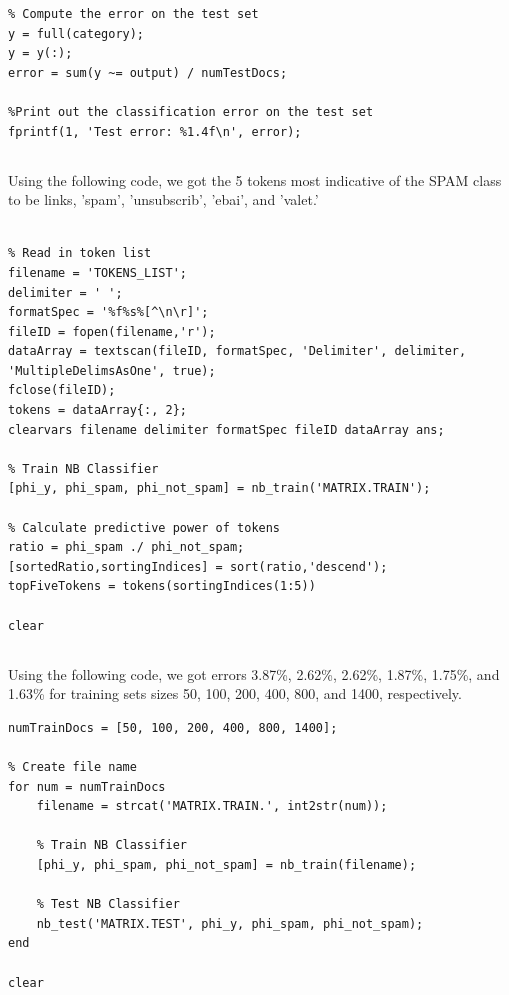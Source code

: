 \documentclass[11pt,a4paper,titlepage]{article}
\begin{document}
{{\begin{verbatim}
% Compute the error on the test set
y = full(category);
y = y(:);
error = sum(y ~= output) / numTestDocs;

%Print out the classification error on the test set
fprintf(1, 'Test error: %1.4f\n', error);
\end{verbatim}
}\label{prob:3a}
\subsection{}{
\quad Using the following code, we got the 5 tokens most indicative of the SPAM class to be links, 'spam', 'unsubscrib', 'ebai', and 'valet.' 
\begin{verbatim}

% Read in token list
filename = 'TOKENS_LIST';
delimiter = ' ';
formatSpec = '%f%s%[^\n\r]';
fileID = fopen(filename,'r');
dataArray = textscan(fileID, formatSpec, 'Delimiter', delimiter, 'MultipleDelimsAsOne', true);
fclose(fileID);
tokens = dataArray{:, 2};
clearvars filename delimiter formatSpec fileID dataArray ans;

% Train NB Classifier
[phi_y, phi_spam, phi_not_spam] = nb_train('MATRIX.TRAIN');

% Calculate predictive power of tokens
ratio = phi_spam ./ phi_not_spam;
[sortedRatio,sortingIndices] = sort(ratio,'descend');
topFiveTokens = tokens(sortingIndices(1:5))

clear
\end{verbatim}
}\label{prob:3b}
\subsection{}{
\quad Using the following code, we got errors 3.87\%, 2.62\%, 2.62\%, 1.87\%, 1.75\%, and 1.63\% for training sets sizes 50, 100, 200, 400, 800, and 1400, respectively.
\begin{verbatim}
numTrainDocs = [50, 100, 200, 400, 800, 1400];

% Create file name
for num = numTrainDocs
    filename = strcat('MATRIX.TRAIN.', int2str(num));

    % Train NB Classifier
    [phi_y, phi_spam, phi_not_spam] = nb_train(filename);

    % Test NB Classifier
    nb_test('MATRIX.TEST', phi_y, phi_spam, phi_not_spam);
end

clear
\end{verbatim}
}\label{prob:3c}
}
\end{document}
